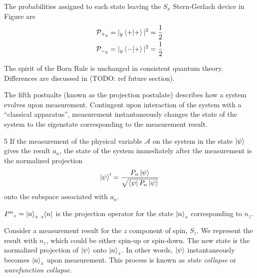 The probabilities assigned to each state leaving the $S_x$ Stern-Gerlach device in Figure  are
\begin{align}
    \mathcal{P}_{+_y} &= |_y\braket{+|+}|^2 = \frac{1}{2} \\
    \mathcal{P}_{-_y} &= |_y\braket{-|+}|^2 = \frac{1}{2}
\end{align}

The spirit of the Born Rule is unchanged in consistent quantum theory. Differences are discussed in (TODO: ref future section).

The fifth postualte (known as the projection postulate) describes how a system evolves upon measurement. Contingent upon interaction of the system with a ``classical apparatus'', measurement instantaneously changes the state of the system to the eigenstate corresponding to the measurement result.

\begin{Thm:Postulate}{5}
    If the measurement of the physical variable $\mathcal{A}$ on the system in the state $\ket{\psi}$ gives the result $a_n$, the state of the system immediately after the measurement is the normalized projection
    \begin{align}
        \ket{\psi}^\prime = \frac{P_n\ket{\psi}}{\sqrt{\bra{\psi}P_n\ket{\psi}
        }}
    \end{align}
    onto the subspace associated with $a_n$.
\end{Thm:Postulate}

${P^n}_z = \ket{n}_z\tensor[_z]{\bra{n}}{}$ is the projection operator for the state $\ket{n}_z$ corresponding to $n_z$.

Consider a measurement result for the $z$ component of spin, $S_z$. We represent the result with $n_z$, which could be either spin-up or spin-down. The new state is the normalized projection of $\ket{\psi}$ onto $\ket{n}_z$. In other words, $\ket{\psi}$ instantaneously becomes $\ket{n}_z$ upon measurement. This process is known as \textit{state collapse} or \textit{wavefunction collapse}.

